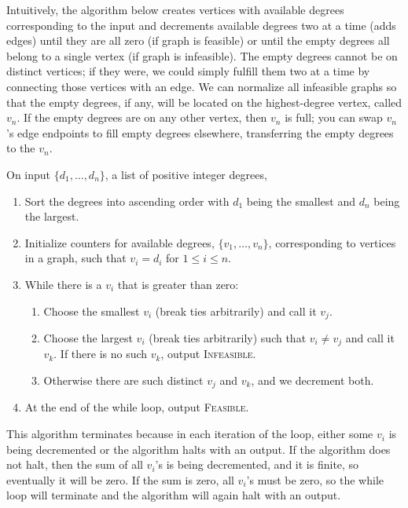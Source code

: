 \documentclass[12pt]{article}
\begin{document}
Intuitively, the algorithm below creates vertices with available degrees
corresponding to the input
and decrements available degrees two at a time (adds edges) until they are
all zero (if graph is feasible) or until the empty degrees all
belong to a single
vertex (if graph is infeasible).
The empty degrees cannot be on distinct vertices;
if they were, we could simply fulfill them two at a time by connecting those
vertices with an edge. We can normalize all infeasible graphs so that the
empty degrees, if any, will be located on the highest-degree vertex, called
$v_n$. If the
empty degrees are on any other vertex, then $v_n$ is
full; you can swap $v_n$'s edge endpoints to fill
empty degrees elsewhere, transferring the empty degrees to the
$v_n$.

On input $\{d_1,\ldots ,d_n\}$, a list of positive integer degrees,

\begin{enumerate}
\item
Sort the degrees into ascending order with $d_1$ being the smallest and
$d_n$ being the largest.
\item
Initialize counters for available degrees, $\{v_1,\ldots ,v_n\}$,
corresponding to vertices in a
graph, such that $v_i = d_i$ for $1 \le i \le n$.
\item
While there is a $v_i$ that is greater than zero:
\begin{enumerate}
\item Choose the smallest $v_i$ (break ties arbitrarily) and
call it $v_j$.
\item Choose the largest $v_i$ (break ties arbitrarily) such
that $v_i \ne v_j$ and call it $v_k$. If there is no such $v_k$, output
\textsc{Infeasible}.
\item Otherwise there are such distinct $v_j$ and $v_k$, and we decrement both.
\end{enumerate}
\item
At the end of the while loop, output \textsc{Feasible}.
\end{enumerate}

This algorithm terminates because in each iteration of the loop, either
some $v_i$ is being decremented or the algorithm halts with an output.
If the algorithm does not halt, then the sum of all $v_i$'s is being
decremented, and it is finite, so eventually it will be zero. If the sum
is zero, all $v_i$'s must be zero, so the while loop will terminate and the
algorithm will again halt with an output.
\end{document}
